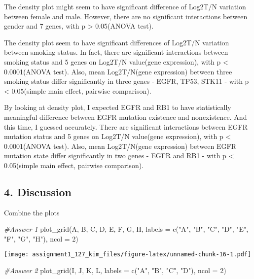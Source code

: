 \documentclass[
]{article}
\newenvironment{Shaded}{\begin{snugshade}}{\end{snugshade}}
\newcommand{\AttributeTok}[1]{\textcolor[rgb]{0.77,0.63,0.00}{#1}}
\newcommand{\CommentTok}[1]{\textcolor[rgb]{0.56,0.35,0.01}{\textit{#1}}}
\newcommand{\DecValTok}[1]{\textcolor[rgb]{0.00,0.00,0.81}{#1}}
\newcommand{\FunctionTok}[1]{\textcolor[rgb]{0.00,0.00,0.00}{#1}}
\newcommand{\NormalTok}[1]{#1}
\newcommand{\StringTok}[1]{\textcolor[rgb]{0.31,0.60,0.02}{#1}}
\begin{document}
The density plot might seem to have significant difference of Log2T/N
variation between female and male. However, there are no significant
interactions between gender and 7 genes, with p \textgreater{}
0.05(ANOVA test).

The density plot seem to have significant differences of Log2T/N
variation between smoking status. In fact, there are significant
interactions between smoking status and 5 genes on Log2T/N value(gene
expression), with p \textless{} 0.0001(ANOVA test). Also, mean
Log2T/N(gene expression) between three smoking status differ
significantly in three genes - EGFR, TP53, STK11 - with p \textless{}
0.05(simple main effect, pairwise comparison).

By looking at density plot, I expected EGFR and RB1 to have
statistically meaningful difference between EGFR mutation existence and
nonexistence. And this time, I guessed accurately. There are significant
interactions between EGFR mutation status and 5 genes on Log2T/N
value(gene expression), with p \textless{} 0.0001(ANOVA test). Also,
mean Log2T/N(gene expression) between EGFR mutation state differ
significantly in two genes - EGFR and RB1 - with p \textless{}
0.05(simple main effect, pairwise comparison).

\hypertarget{discussion}{%
\subsection{4. Discussion}\label{discussion}}

Combine the plots

\begin{Shaded}
\begin{Highlighting}[]
\CommentTok{\#Answer 1}
\FunctionTok{plot\_grid}\NormalTok{(A, B, C, D, E, F, G, H,}
          \AttributeTok{labels =} \FunctionTok{c}\NormalTok{(}\StringTok{"A"}\NormalTok{, }\StringTok{"B"}\NormalTok{, }\StringTok{"C"}\NormalTok{, }\StringTok{"D"}\NormalTok{, }\StringTok{"E"}\NormalTok{, }\StringTok{"F"}\NormalTok{, }\StringTok{"G"}\NormalTok{, }\StringTok{"H"}\NormalTok{),}
          \AttributeTok{ncol =} \DecValTok{2}\NormalTok{)}
\end{Highlighting}
\end{Shaded}

\texttt{[image: assignment1\_127\_kim\_files/figure-latex/unnamed-chunk-16-1.pdf]}

\begin{Shaded}
\begin{Highlighting}[]
\CommentTok{\#Answer 2}
\FunctionTok{plot\_grid}\NormalTok{(I, J, K, L,}
          \AttributeTok{labels =} \FunctionTok{c}\NormalTok{(}\StringTok{"A"}\NormalTok{, }\StringTok{"B"}\NormalTok{, }\StringTok{"C"}\NormalTok{, }\StringTok{"D"}\NormalTok{),}
          \AttributeTok{ncol =} \DecValTok{2}\NormalTok{)}
\end{Highlighting}
\end{Shaded}
\end{document}

